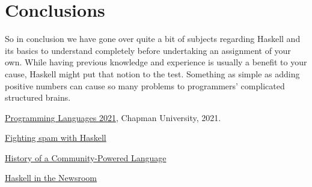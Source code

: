 \documentclass{article}
\begin{document}
\section{Conclusions}\label{conclusions}

So in conclusion we have gone over quite a bit of subjects regarding Haskell and its basics to understand completely before undertaking an assignment of your own. While having previous knowledge and experience is usually a benefit to your cause, Haskell might put that notion to the test. Something as simple as adding positive numbers can cause so many problems to programmers' complicated structured brains. 

\begin{thebibliography}{99}
 \href{https://github.com/alexhkurz/programming-languages-2021/blob/main/README.md}{Programming Languages 2021}, Chapman University, 2021.

\href{https://engineering.fb.com/2015/06/26/security/fighting-spam-with-haskell/}{Fighting spam with Haskell}

\href{https://serokell.io/blog/haskell-history}{History of a Community-Powered Language}

{\href{https://www.infoq.com/presentations/haskell-newsroom-nyt/}{Haskell in the Newsroom}}

\end{thebibliography}
\end{document}
